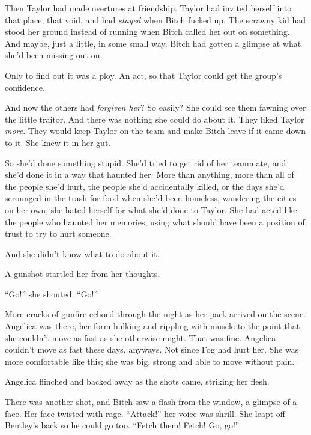 Then Taylor had made overtures at friendship.  Taylor had invited herself into that place, that void, and had \emph{stayed} when Bitch fucked up.  The scrawny kid had stood her ground instead of running when Bitch called her out on something.  And maybe, just a little, in some small way, Bitch had gotten a glimpse at what she'd been missing out on.



Only to find out it was a ploy.  An act, so that Taylor could get the group's confidence.



And now the others had \emph{forgiven her}?  So easily?  She could see them fawning over the little traitor.  And there was nothing she could do about it.  They liked Taylor \emph{more}.  They would keep Taylor on the team and make Bitch leave if it came down to it.  She knew it in her gut.



So she'd done something stupid.  She'd tried to get rid of her teammate, and she'd done it in a way that haunted her.  More than anything, more than all of the people she'd hurt, the people she'd accidentally killed, or the days she'd scrounged in the trash for food when she'd been homeless, wandering the cities on her own, she hated herself for what she'd done to Taylor.  She had acted like the people who haunted her memories, using what should have been a position of trust to try to hurt someone.



And she didn't know what to do about it.



A gunshot startled her from her thoughts.



``Go!'' she shouted.  ``Go!''



More cracks of gunfire echoed through the night as her pack arrived on the scene.  Angelica was there, her form hulking and rippling with muscle to the point that she couldn't move as fast as she otherwise might.  That was fine.  Angelica couldn't move as fast these days, anyways.  Not since Fog had hurt her.  She was more comfortable like this; she was big, strong and able to move without pain.



Angelica flinched and backed away as the shots came, striking her flesh.



There was another shot, and Bitch saw a flash from the window, a glimpse of a face.  Her face twisted with rage.  ``Attack!''  her voice was shrill.  She leapt off Bentley's back so he could go too.  ``Fetch them!  Fetch!  Go, go!''



